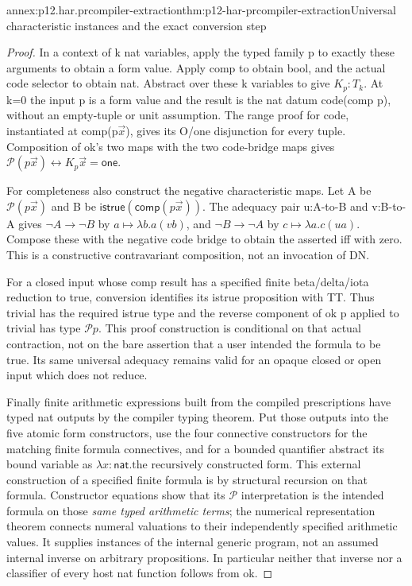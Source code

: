\begin{annexitem}{annex:p12.har.prcompiler-extraction}{thm:p12-har-prcompiler-extraction}{Universal characteristic instances and the exact conversion step}
\begin{proof}
In a context of k nat variables, apply the typed family p to exactly
these arguments to obtain a form value. Apply comp to obtain bool,
and the actual code selector to obtain nat. Abstract over these k
variables to give \(K_p:T_k\). At k=0 the input p is a form value
and the result is the nat datum code(comp p), without an empty-tuple
or unit assumption. The range proof for code, instantiated at
comp(p\(\vec x\)), gives its O/one disjunction for every tuple.
Composition of ok's two maps with the two code-bridge maps gives
\(\mathcal P(p\vec x)\leftrightarrow K_p\vec x=\mathsf{one}\).

For completeness also construct the negative characteristic maps.
Let A be \(\mathcal P(p\vec x)\) and B be
\(\mathsf{istrue}(\mathsf{comp}(p\vec x))\). The adequacy pair
u:A-to-B and v:B-to-A gives \(\neg A\to\neg B\) by
\(a\mapsto\lambda b.a(v b)\), and \(\neg B\to\neg A\) by
\(c\mapsto\lambda a.c(u a)\). Compose these with the negative
code bridge to obtain the asserted iff with zero. This is a
constructive contravariant composition, not an invocation of DN.

For a closed input whose comp result has a specified finite
beta/delta/iota reduction to true, conversion identifies its istrue
proposition with TT. Thus trivial has the required istrue type and
the reverse component of ok p applied to trivial has type
\(\mathcal P p\). This proof construction is conditional on that
actual contraction, not on the bare assertion that a user intended
the formula to be true. Its same universal adequacy remains valid
for an opaque closed or open input which does not reduce.

Finally finite arithmetic expressions built from the compiled
prescriptions have typed nat outputs by the compiler typing theorem.
Put those outputs into the five atomic form constructors, use the
four connective constructors for the matching finite formula
connectives, and for a bounded quantifier abstract its bound variable
as \(\lambda x:\mathsf{nat}.\text{the recursively constructed form}\).
This external construction of a specified finite formula is by
structural recursion on that formula. Constructor equations show
that its \(\mathcal P\) interpretation is the intended formula
on those \emph{same typed arithmetic terms}; the numerical
representation theorem connects numeral valuations to their
independently specified arithmetic values. It supplies instances of
the internal generic program, not an assumed internal inverse on
arbitrary propositions. In particular neither that inverse nor a
classifier of every host nat function follows from ok.
\end{proof}
\end{annexitem}
